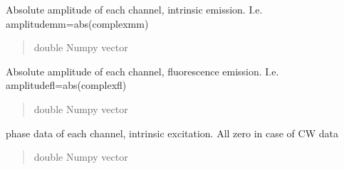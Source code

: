 \documentclass[letterpaper,10pt,english]{sphinxmanual}
\begin{document}
\begin{fulllineitems}
\begin{fulllineitems}
\begin{quote}
\begin{description}
\end{description}\end{quote}

\end{fulllineitems}


\begin{fulllineitems}
\label{\detokenize{_autosummary/nirfasterff.base.data.FLdata:nirfasterff.base.data.FLdata.amplitudemm}}
\pysigstartsignatures
\pysigline
{}
\pysigstopsignatures
\sphinxAtStartPar
Absolute amplitude of each channel, intrinsic emission. I.e. amplitudemm=abs(complexmm)
\begin{quote}\begin{description}
\sphinxAtStartPar
double Numpy vector

\end{description}\end{quote}

\end{fulllineitems}


\begin{fulllineitems}
\label{\detokenize{_autosummary/nirfasterff.base.data.FLdata:nirfasterff.base.data.FLdata.amplitudefl}}
\pysigstartsignatures
\pysigline
{}
\pysigstopsignatures
\sphinxAtStartPar
Absolute amplitude of each channel, fluorescence emission. I.e. amplitudefl=abs(complexfl)
\begin{quote}\begin{description}
\sphinxAtStartPar
double Numpy vector

\end{description}\end{quote}

\end{fulllineitems}


\begin{fulllineitems}
\label{\detokenize{_autosummary/nirfasterff.base.data.FLdata:nirfasterff.base.data.FLdata.phasex}}
\pysigstartsignatures
\pysigline
{}
\pysigstopsignatures
\sphinxAtStartPar
phase data of each channel, intrinsic excitation. All zero in case of CW data
\begin{quote}\begin{description}
\sphinxAtStartPar
double Numpy vector


\end{description}
\end{quote}
\end{fulllineitems}
\end{fulllineitems}
\end{document}
